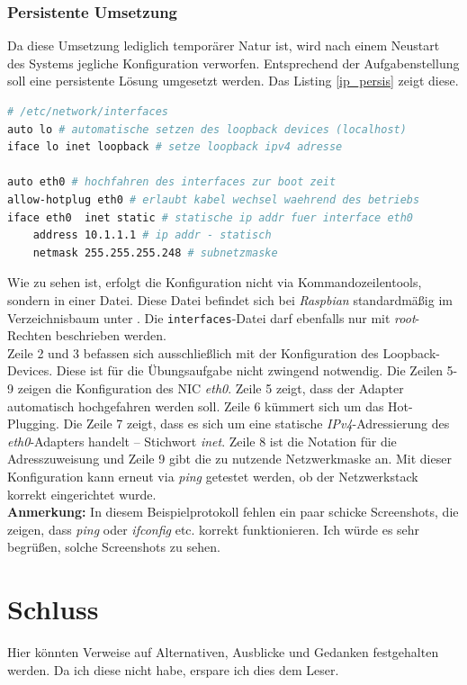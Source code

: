 \documentclass[paper=a4,fontsize=11pt]{scrartcl}%
\numberwithin{equation}{section}
\begin{document}
\subsubsection{Persistente Umsetzung}
Da diese Umsetzung lediglich temporärer Natur ist, wird nach einem Neustart des Systems jegliche Konfiguration verworfen. Entsprechend der Aufgabenstellung soll eine persistente Lösung umgesetzt werden. Das Listing \ref{ip_persis} zeigt diese.
\begin{lstlisting}[style=Bash, language=Bash, label=ip_persis]
# /etc/network/interfaces
auto lo # automatische setzen des loopback devices (localhost)
iface lo inet loopback # setze loopback ipv4 adresse

auto eth0 # hochfahren des interfaces zur boot zeit
allow-hotplug eth0 # erlaubt kabel wechsel waehrend des betriebs
iface eth0  inet static # statische ip addr fuer interface eth0
	address 10.1.1.1 # ip addr - statisch
	netmask 255.255.255.248 # subnetzmaske
\end{lstlisting}
Wie zu sehen ist, erfolgt die Konfiguration nicht via Kommandozeilentools, sondern in einer Datei. Diese Datei befindet sich bei \emph{Raspbian} standardmäßig im Verzeichnisbaum unter . Die \texttt{interfaces}-Datei darf ebenfalls nur mit \emph{root}-Rechten beschrieben werden.\\
Zeile 2 und 3 befassen sich ausschließlich mit der Konfiguration des Loopback-Devices. Diese ist für die Übungsaufgabe nicht zwingend notwendig. Die Zeilen 5-9 zeigen die Konfiguration des \ac{NIC} \emph{eth0}. Zeile 5 zeigt, dass der Adapter automatisch hochgefahren werden soll. Zeile 6 kümmert sich um das Hot-Plugging. Die Zeile 7 zeigt, dass es sich um eine statische \emph{IPv4}-Adressierung des \textit{eth0}-Adapters handelt -- Stichwort \emph{inet}. Zeile 8 ist die Notation für die Adresszuweisung und Zeile 9 gibt die zu nutzende Netzwerkmaske an. Mit dieser Konfiguration kann erneut via \emph{ping} getestet werden, ob der Netzwerkstack korrekt eingerichtet wurde.\\

\textbf{Anmerkung:} In diesem Beispielprotokoll fehlen ein paar schicke Screenshots, die zeigen, dass \emph{ping} oder \emph{ifconfig} etc. korrekt funktionieren. Ich würde es sehr begrüßen, solche Screenshots zu sehen.

\section{Schluss}
Hier könnten Verweise auf Alternativen, Ausblicke und Gedanken festgehalten werden. Da ich diese nicht habe, erspare ich dies dem Leser.
\end{document}
